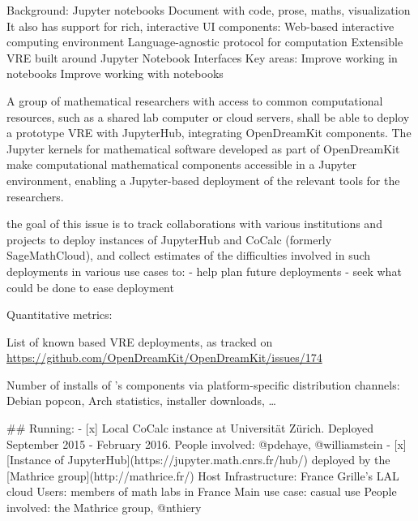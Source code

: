 \begin{Aim 1}
\begin{Aim 2}
\begin{itemize}
Background: Jupyter notebooks
Document with code, prose, maths, visualization
It also has support for rich, interactive UI components:
Web-based interactive computing environment
Language-agnostic protocol for computation
Extensible VRE built around Jupyter
Notebook Interfaces
Key areas:
Improve working in notebooks
Improve working with notebooks

 A group of mathematical researchers with access to common 
computational resources, such as a shared lab computer or cloud servers, 
shall be able to deploy a prototype VRE with JupyterHub, integrating 
OpenDreamKit components. The Jupyter kernels for mathematical software 
developed as part of OpenDreamKit make computational mathematical 
components accessible in a Jupyter environment, enabling a Jupyter-based 
deployment of the relevant tools for the researchers.

  the goal of this issue is to track collaborations with various institutions and projects
  to deploy instances of JupyterHub and CoCalc (formerly SageMathCloud), and collect estimates of
  the difficulties involved in such deployments in various use cases to:
  - help plan future deployments
  - seek what could be done to ease deployment
  
Quantitative metrics:
\begin{description}
\item List of known \ODK based VRE deployments, as tracked on
  \url{https://github.com/OpenDreamKit/OpenDreamKit/issues/174}
\item Number of installs of \ODK's components via platform-specific
  distribution channels: Debian popcon, Arch statistics, installer
  downloads, \dots
\end{description}

  ## Running:
  - [x] Local CoCalc instance at Universität Zürich.
      Deployed September 2015 - February 2016.
      People involved: @pdehaye, @williamstein
  - [x] [Instance of JupyterHub](https://jupyter.math.cnrs.fr/hub/) deployed by the [Mathrice group](http://mathrice.fr/)
      Host Infrastructure: France Grille's LAL cloud
      Users: members of math labs in France
      Main use case: casual use 
      People involved: the Mathrice group, @nthiery


\end{itemize}
\end{Aim 2}
\end{Aim 1}
